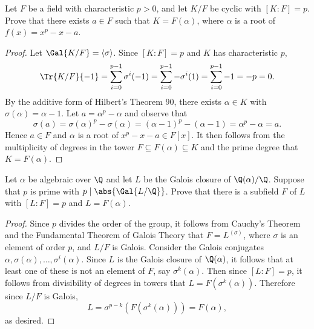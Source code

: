 \documentclass[10pt]{amsart}
\begin{document}
\setcounter{thm}{2}
\begin{thm}
  Let $F$ be a field with characteristic $p > 0$, and let $K/F$ be cyclic with $[K : F] = p$.
  Prove that there exists $a \in F$ such that $K = F(\alpha)$, where $\alpha$ is a root of $f(x) = x^p - x - a$.
  
  \begin{proof}
    Let $\Gal{K/F} = \left< \sigma \right>$.
    Since $[K : F] = p$ and $K$ has characteristic $p$, 
    $$\Tr{K/F}{-1} = \sum_{i=0}^{p-1} \sigma^i(-1) = \sum_{i=0}^{p-1} -\sigma^i(1) = \sum_{i=0}^{p-1} -1 = -p = 0.$$
    By the additive form of Hilbert's Theorem 90, there exists $\alpha \in K$ with $\sigma(\alpha) = \alpha - 1$.
    Let $a = \alpha^p - \alpha$ and observe that 
    $$\sigma(a) = \sigma(\alpha)^p - \sigma(\alpha) = (\alpha - 1)^p - (\alpha - 1) = \alpha^p - \alpha = a.$$
    Hence $a \in F$ and $\alpha$ is a root of $x^p - x - a \in F[x]$.
    It then follows from the multiplicity of degrees in the tower $F \subseteq F(\alpha) \subseteq K$ and the prime degree that $K = F(\alpha)$.
  \end{proof}
\end{thm}

\begin{thm}
  Let $\alpha$ be algebraic over $\Q$ and let $L$ be the Galois closure of $\Q(\alpha)/\Q$.
  Suppose that $p$ is prime with $p \mid \abs{\Gal{L/\Q}}$.
  Prove that there is a subfield $F$ of $L$ with $[L : F] = p$ and $L = F(\alpha)$.
  
  \begin{proof}
    Since $p$ divides the order of the group, it follows from Cauchy's Theorem and the Fundamental Theorem of Galois Theory that $F = L^{\left< \sigma \right>}$, where $\sigma$ is an element of order $p$, and $L/F$ is Galois.
    Consider the Galois conjugates $\alpha, \sigma(\alpha), \ldots, \sigma^i(\alpha)$.
    Since $L$ is the Galois closure of $\Q(\alpha)$, it follows that at least one of these is not an element of $F$, say $\sigma^k(\alpha)$.
    Then since $[L : F] = p$, it follows from divisibility of degrees in towers that $L = F(\sigma^k(\alpha))$.
    Therefore since $L/F$ is Galois, 
    $$L = \sigma^{p-k} (F(\sigma^k(\alpha))) = F(\alpha),$$ 
    as desired.
  \end{proof}
\end{thm}
\end{document}

